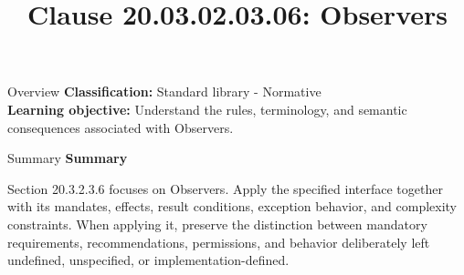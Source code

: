 \documentclass[10pt,letterpaper]{article}
\title{Clause 20.03.02.03.06: Observers}
\author{}
\date{}
\begin{document}
\maketitle
\begin{CornellOverviewBox}{Overview}
\textbf{Classification:} Standard library - Normative\\[2pt]
\textbf{Learning objective:} Understand the rules, terminology, and semantic consequences associated with Observers.
\end{CornellOverviewBox}\begin{CornellSummaryBox}{Summary}
{\sffamily\bfseries\color{Accent} Summary}\par\vspace{3pt}Section 20.3.2.3.6 focuses on Observers. Apply the specified interface together with its mandates, effects, result conditions, exception behavior, and complexity constraints. When applying it, preserve the distinction between mandatory requirements, recommendations, permissions, and behavior deliberately left undefined, unspecified, or implementation-defined.
\end{CornellSummaryBox}
\end{document}
